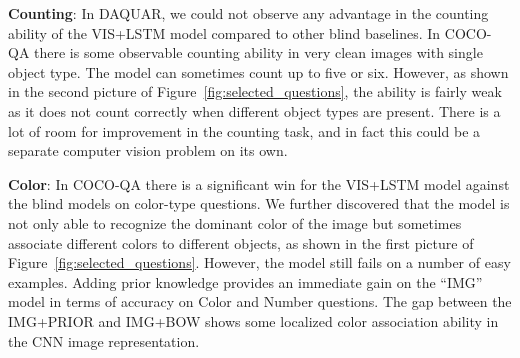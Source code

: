 \documentclass{article} %
\renewcommand{\#}[1]{\textbf{#1}}
\begin{document}
\textbf{Counting}: In DAQUAR, we could not observe any advantage in the
counting ability of the VIS+LSTM model compared to other blind baselines. In
COCO-QA there is some observable counting ability in very clean images with
single object type. The model can sometimes count up to five or six. However,
as shown in the second picture of Figure~\ref{fig:selected_questions}, the
ability is fairly weak as it does not count correctly when different object
types are present. There is a lot of room for improvement in the counting task,
and in fact this could be a separate computer vision problem on its own.

\textbf{Color}: In COCO-QA there is a significant win for the VIS+LSTM model
against the blind models on color-type questions. We further discovered that
the model is not only able to recognize the dominant color of the image but
sometimes associate different colors to different objects, as shown in the
first picture of Figure~\ref{fig:selected_questions}. However, the model still
fails on a number of easy examples. Adding prior knowledge provides an
immediate gain on the ``IMG'' model in terms of accuracy on Color and Number
questions. The gap between the IMG+PRIOR and IMG+BOW shows some localized color
association ability in the CNN image representation.
\end{document}
